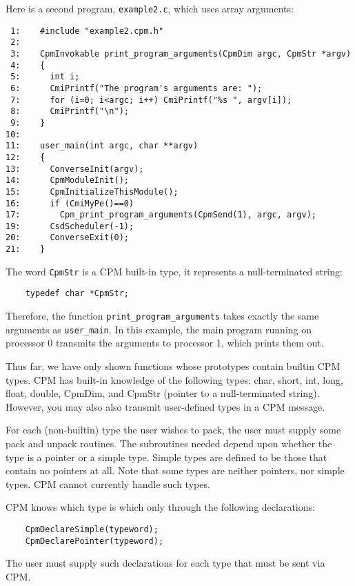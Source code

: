 Here is a second program, {\tt example2.c}, which uses array arguments:

\begin{verbatim}
 1:    #include "example2.cpm.h"
 2:   
 3:    CpmInvokable print_program_arguments(CpmDim argc, CpmStr *argv)
 4:    {
 5:      int i;
 6:      CmiPrintf("The program's arguments are: ");
 7:      for (i=0; i<argc; i++) CmiPrintf("%s ", argv[i]);
 8:      CmiPrintf("\n");
 9:    }
10:
11:    user_main(int argc, char **argv)
12:    {
13:      ConverseInit(argv);
14:      CpmModuleInit();
15:      CpmInitializeThisModule();
16:      if (CmiMyPe()==0)
17:        Cpm_print_program_arguments(CpmSend(1), argc, argv);
19:      CsdScheduler(-1);
20:      ConverseExit(0);
21:    }
\end{verbatim}

The word {\tt CpmStr} is a CPM built-in type, it represents a
null-terminated string:

\begin{verbatim}
	typedef char *CpmStr;
\end{verbatim}

Therefore, the function {\tt print_program_arguments} takes exactly
the same arguments as {\tt user_main}.  In this example, the main
program running on processor 0 transmits the arguments to processor 1,
which prints them out.

Thus far, we have only shown functions whose prototypes contain
builtin CPM types.  CPM has built-in knowledge of the following types:
char, short, int, long, float, double, CpmDim, and CpmStr (pointer to
a null-terminated string).  However, you may also also transmit
user-defined types in a CPM message.

For each (non-builtin) type the user wishes to pack, the user must
supply some pack and unpack routines.  The subroutines needed depend
upon whether the type is a pointer or a simple type.  Simple types are
defined to be those that contain no pointers at all.  Note that some
types are neither pointers, nor simple types.  CPM cannot currently
handle such types.

CPM knows which type is which only through the following declarations:

\begin{verbatim}
    CpmDeclareSimple(typeword);
    CpmDeclarePointer(typeword);
\end{verbatim}

The user must supply such declarations for each type that must be sent
via CPM.

